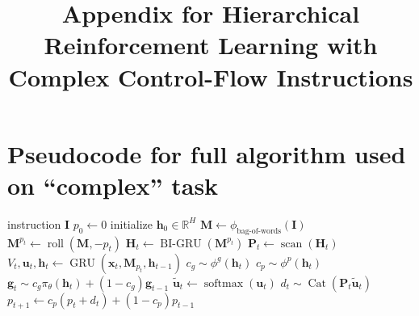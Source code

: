 \documentclass{article}
\title{Appendix for Hierarchical Reinforcement Learning with Complex Control-Flow
Instructions}
\DeclareMathOperator{\GRU}{GRU}
\DeclareMathOperator{\BIGRU}{BI-GRU}
\DeclareMathOperator{\Cat}{Cat}
\DeclareMathOperator{\roll}{roll}
\DeclareMathOperator{\scan}{scan}
\DeclareMathOperator{\softmax}{softmax}
\begin{document}
\date{}
\maketitle
\section{Pseudocode for full algorithm used on ``complex'' task}
\label{full-algorithm}

\begin{algorithm}[h]
\label{subtask-update}
  \begin{algorithmic}[1]
     instruction $\mathbf{I}$
    \STATE $p_0 \gets 0$
    \STATE initialize $\mathbf{h}_0 \in \mathbb{R}^H$
    \STATE $\mathbf{M} \gets \phi_{\text{bag-of-words}}(\mathbf{I})$
    \STATE $\mathbf{M}^{p_t} \gets \roll\left(\mathbf{M}, -p_t\right)$
    \STATE ${\mathbf{H}_t} \gets \BIGRU\left(\mathbf{M}^{p_t}\right)$
    \STATE ${\mathbf{P}_t \gets \scan\left(\mathbf{H}_t\right)}$
    \STATE $V_t, \mathbf{u}_t, \mathbf{h}_t  \gets \GRU\left(\mathbf{x}_t, \mathbf{M}_{p_t}, \mathbf{h}_{t-1}\right)$
    \STATE $c_g \sim \phi^g\left(\mathbf{h}_t\right)$
    \STATE $c_p \sim \phi^p\left(\mathbf{h}_t\right)$
    \STATE $\mathbf{g}_{t} \sim c_g \pi_\theta\left(\mathbf{h}_t\right) + (1- c_g)\mathbf{g}_{t-1}$
    \STATE $\tilde{\mathbf{u}}_{t} \gets \softmax\left(\mathbf{u}_t\right)$
    \STATE $d_{t} \sim \Cat\left(\mathbf{P}_t\tilde{\mathbf{u}}_t\right)$ 
    \STATE $p_{t + 1} \gets c_p\left(p_t + d_t\right) + (1-c_p)p_{t-1}$
    \ENDFOR
  \end{algorithmic}
\end{algorithm}
\end{document}
